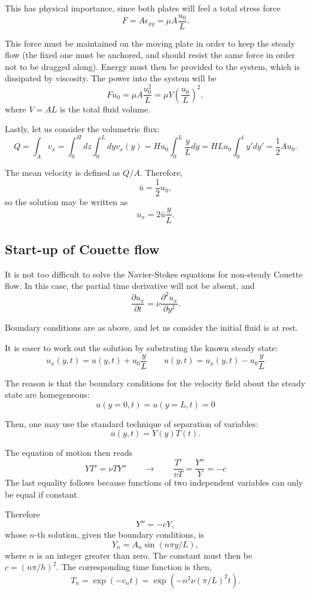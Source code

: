 This has physical importance, since both plates will feel a total
stress force
\[
F= A \epsilon_{xy} = \mu A \frac{u_0}{L} .
\]

This force must be maintained on the moving plate in order to keep the
steady flow (the fixed one must be anchored, and should resist the
same force in order not to be dragged along). Energy must then be
provided to the system, which is dissipated by viscosity. The power
into the system will be
\[
F u_0 = \mu A \frac{u_0^2}{L} = \mu V  \left( \frac{u_0}{L}\right)^2 ,
\]
where $V=AL$ is the total fluid volume.

Lastly, let us consider the volumetric flux:
\[
Q = \int_A v_x = \int_0^H dz \int_0^L dy v_x(y) =
H  u_0 \int_0^L \frac{y}{L} dy =
H L  u_0 \int_0^1 y' dy' =
\frac12 A u_0 .
\]

The mean velocity is defined as $Q/A$. Therefore,
\[
\bar{u} = \frac12 u_0 ,
\]
so the solution may be written as
\[
u_x =   2\bar{u} \frac{y}{L} .
\]




\subsection{Start-up of Couette flow}

It is not too difficult to solve the Navier-Stokes equations for
non-steady Couette flow. In this case, the partial time derivative
will not be absent, and
\[
{\frac {\partial u_x}{\partial t}}=\nu {\frac {\partial
    ^{2}u_x}{\partial y^{2}}}.
\]

Boundary conditions are as above, and let us consider the initial
fluid is at rest.

It is easer to work out the solution by substrating the known steady state:
\[
u_x(y,t) = u(y,t)  + u_0 \frac{y}{L} \qquad
u(y,t) = u_x(y,t)  - u_0 \frac{y}{L} 
\]

The reason is that the boundary conditions for the velocity field
about the steady state are homegeneous:
\[
u(y=0,t) = u(y=L,t) = 0
\]

Then, one may use the standard technique of separation of variables:
\[
u(y,t) = Y(y) T(t) .
\]

The equation of motion then reads
\[
Y T' = \nu T Y'' \qquad\to\qquad  \frac{T'}{ \nu T} = \frac{Y''}{Y} = -c
\]
The last equality follows because functions of two independent
variables can only be equal if constant.

Therefore
\[
Y''= - c Y ,
\]
whose $n$-th solution, given the boundary conditions, is
\[
Y_n= A_n \sin(n\pi y/L),
\]
where $n$ is an integer greater than zero. The constant must then be
$c=(n\pi/h)^2$. The corresponding time function is then,
\[
T_n=\exp(-c_n t) = \exp(-  n^2 \nu (\pi/L)^2   t) .
\]

